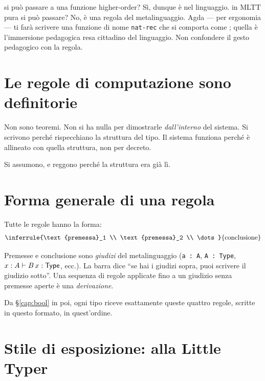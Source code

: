 \begin{oss}
 si pu\`o passare a una funzione higher-order? S\`i, dunque \`e nel linguaggio.  in MLTT pura si pu\`o passare? No, \`e una regola del metalinguaggio. Agda --- per ergonomia --- ti far\`a scrivere una funzione di nome \texttt{nat-rec} che si comporta come ; quella \`e l'immersione pedagogica resa cittadino del linguaggio. Non confondere il gesto pedagogico con la regola.
\end{oss}

\section*{Le regole di computazione sono definitorie}

Non sono teoremi. Non si ha nulla per dimostrarle \emph{dall'interno} del sistema. Si scrivono perch\'e rispecchiano la struttura del tipo. Il sistema funziona perch\'e \`e allineato con quella struttura, non per decreto.

\begin{cero}\label{cero:comp}
Si assumono, e reggono perch\'e la struttura era gi\`a l\`i.
\end{cero}

\section*{Forma generale di una regola}

Tutte le regole hanno la forma:
\[
\inferrule{\text{premessa}_1 \\ \text{premessa}_2 \\ \dots}{\text{conclusione}}
\]

Premesse e conclusione sono \emph{giudizi} del metalinguaggio (\texttt{a : A}, \texttt{A : Type}, $x : A \vdash B\,x : \mathsf{Type}$, ecc.). La barra dice ``se hai i giudizi sopra, puoi scrivere il giudizio sotto''. Una sequenza di regole applicate fino a un giudizio senza premesse aperte \`e una \emph{derivazione}.

\bigskip

\noindent Da \S\ref{cap:bool} in poi, ogni tipo riceve esattamente queste quattro regole, scritte in questo formato, in quest'ordine.

\section*{Stile di esposizione: alla Little Typer}\label{sec:stile}

